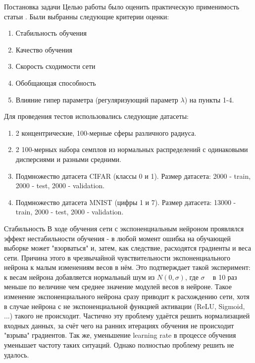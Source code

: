 \documentclass[12pt,a4paper]{scrartcl}
\begin{document}
	
\begin{section}{Постановка задачи}	
	Целью работы было оценить практическую применимость статьи \cite{AddingOne}. Были выбранны следующие критерии оценки:
\begin{enumerate}
	\item Стабильность обучения
	\item Качество обучения
	\item Скорость сходимости сети
	\item Обобщающая способность
	\item Влияние гипер параметра (регуляризующий параметр $\lambda$) на пункты 1-4.
\end{enumerate}

	Для проведения тестов использовались следующие датасеты:
\begin{enumerate}
	\item 2 концентрические, 100-мерные сферы различного радиуса.
	\item 2 100-мерных набора семплов из нормальных распределений с одинаковыми дисперсиями и разными средними.
	\item Подмножество датасета CIFAR (классы 0 и 1). Размер датасета: 2000 - train, 2000 - test, 2000 - validation.
	\item Подмножество датасета MNIST (цифры 1 и 7). Размер датасета: 13000 - train, 2000 - test, 2000 - validation.
\end{enumerate}

\end{section}

\begin{section}{Стабильность}
	В ходе обучения сети с экспоненциальным нейроном проявлялся эффект нестабильности обучения - в любой момент ошибка на обучающей выборке может "взорваться" и, затем, как следствие, расходятся градиенты и веса сети. Причина этого в чрезвычайной чувствительности экспоненциального нейрона к малым изменениям весов в нём. Это подтверждает такой эксперимент: к весам нейрона добавляется нормальный шум из $N(0, \sigma)$, где $\sigma$ ~ в 10 раз меньше по величине чем среднее значение модулей весов в нейроне. Такое изменение экспоненциального нейрона сразу приводит к расхождению сети, хотя в случае нейрона с не экспоненциальной функцией активации (ReLU, Sigmoid, ...) такого не происходит. Частично эту проблему удаётся решить нормализацией входных данных, за счёт чего на ранних итерациях обучения не происходит "взрыва" градиентов. Так же, уменьшение learning rate в процессе обучения уменьшает частоту таких ситуаций. Однако полностью проблему решить не удалось.
\end{section}
\end{document}

